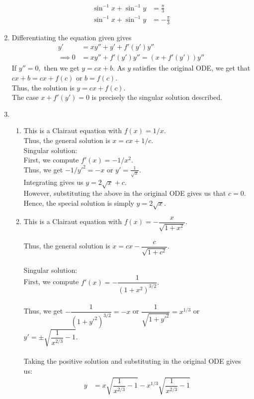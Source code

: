 \documentclass{article}
\begin{document}
\begin{enumerate}[label = Q.\arabic*.]
\begin{align*}
		\sin^{-1}x + \sin^{-1}y &= \frac{\pi}{3}\\
		\sin^{-1}x + \sin^{-1}y &= -\frac{\pi}{3}
	\end{align*}
	\item Differentiating the equation given gives
	\begin{align*} 
		y' &= xy'' + y' + f'(y')y''\\
		\implies 0 &= xy'' + f'(y')y'' = (x + f'(y'))y''
	\end{align*}
	If $y'' = 0,$ then we get $y = cx + b.$ As $y$ satisfies the original ODE, we get that $cx + b = cx + f(c)$ or $b = f(c).$\\
	Thus, the solution is $y = cx + f(c).$\\
	The case $x + f'(y') = 0$ is precisely the singular solution described.
	\item 
	\begin{enumerate}[label = (\roman*)] 
		\item This is a Clairaut equation with $f(x) = 1/x.$\\
		Thus, the general solution is $x = cx + 1/c.$\\
		Singular solution:\\
		First, we compute $f'(x) = -1/x^2.$\\
		Thus, we get $-1/y'^2 = -x$ or $y' = \frac{1}{\sqrt{x}}.$\\
		Integrating gives us $y = 2\sqrt{x} + c.$\\
		However, substituting the above in the original ODE gives us that $c = 0.$ Hence, the special solution is simply $y = 2\sqrt{x}.$
		\item This is a Clairaut equation with $f(x) = -\dfrac{x}{\sqrt{1 + x^2}}.$\\~\\
		Thus, the general solution is $x = cx -\dfrac{c}{\sqrt{1 + c^2}}.$\\~\\
		Singular solution:\\
		First, we compute $f'(x) = -\dfrac{1}{(1 + x^2)^{3/2}}.$\\~\\
		Thus, we get $-\dfrac{1}{(1 + y'^2)^{3/2}} = -x$ or $\dfrac{1}{\sqrt{1 + y'^2}} = x^{1/3}$ or $y' = \pm\sqrt{\dfrac{1}{x^{2/3}} - 1}.$\\~\\
		Taking the positive solution and substituting in the original ODE gives us:
		\begin{align*} 
			y &= x\sqrt{\dfrac{1}{x^{2/3}} - 1} - x^{1/3}\sqrt{\dfrac{1}{x^{2/3}} - 1}\\

\end{align*}
\end{enumerate}
\end{enumerate}
\end{document}
